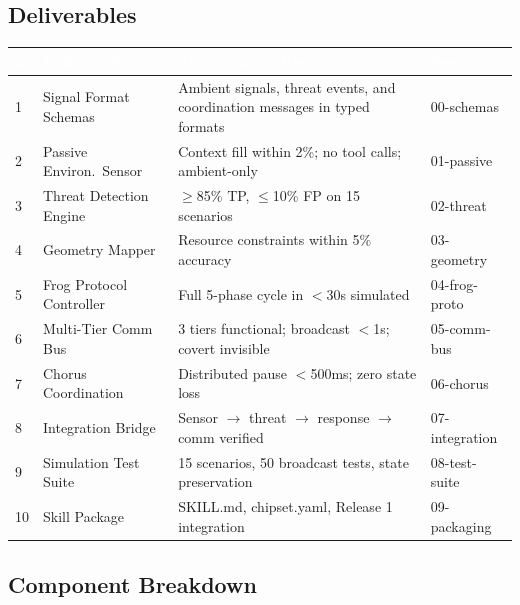 \documentclass[11pt,letterpaper]{article}
\newcommand{\tableheader}[1]{\textbf{\sffamily\textcolor{white}{#1}}}
\begin{document}
\subsection{Deliverables}

\begin{center}
\begin{tabularx}{\textwidth}{C{0.5cm}L{3cm}X L{2.5cm}}
\toprule
{}
\tableheader{\#} & \tableheader{Deliverable} & \tableheader{Acceptance Criteria} & \tableheader{Spec} \\
 & Signal Format Schemas & Ambient signals, threat events, and coordination messages in typed formats & 00-schemas \\
2 & Passive Environ.\ Sensor & Context fill within 2\%; no tool calls; ambient-only & 01-passive \\
3 & Threat Detection Engine & $\geq$85\% TP, $\leq$10\% FP on 15 scenarios & 02-threat \\
4 & Geometry Mapper & Resource constraints within 5\% accuracy & 03-geometry \\
5 & Frog Protocol Controller & Full 5-phase cycle in $<$30s simulated & 04-frog-proto \\
6 & Multi-Tier Comm Bus & 3 tiers functional; broadcast $<$1s; covert invisible & 05-comm-bus \\
7 & Chorus Coordination & Distributed pause $<$500ms; zero state loss & 06-chorus \\
8 & Integration Bridge & Sensor $\to$ threat $\to$ response $\to$ comm verified & 07-integration \\
9 & Simulation Test Suite & 15 scenarios, 50 broadcast tests, state preservation & 08-test-suite \\
10 & Skill Package & SKILL.md, chipset.yaml, Release 1 integration & 09-packaging \\
\bottomrule
\end{tabularx}
\end{center}

\subsection{Component Breakdown}
\end{document}
